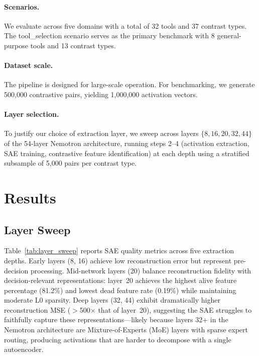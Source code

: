 \documentclass[runningheads]{llncs}
\begin{document}
\paragraph{Scenarios.} We evaluate across five domains with a total of 32 tools and 37 contrast types. The tool\_selection scenario serves as the primary benchmark with 8 general-purpose tools and 13 contrast types.

\paragraph{Dataset scale.} The pipeline is designed for large-scale operation. For benchmarking, we generate 500,000 contrastive pairs, yielding 1,000,000 activation vectors.

\paragraph{Layer selection.} To justify our choice of extraction layer, we sweep across layers $\{8, 16, 20, 32, 44\}$ of the 54-layer Nemotron architecture, running steps 2--4 (activation extraction, SAE training, contrastive feature identification) at each depth using a stratified subsample of 5,000 pairs per contrast type.

\section{Results}
\label{sec:results}

\subsection{Layer Sweep}

Table~\ref{tab:layer_sweep} reports SAE quality metrics across five extraction depths. Early layers (8, 16) achieve low reconstruction error but represent pre-decision processing. Mid-network layers (20) balance reconstruction fidelity with decision-relevant representations: layer~20 achieves the highest alive feature percentage (81.2\%) and lowest dead feature rate (0.19\%) while maintaining moderate L0 sparsity. Deep layers (32, 44) exhibit dramatically higher reconstruction MSE ($>$500$\times$ that of layer~20), suggesting the SAE struggles to faithfully capture these representations---likely because layers 32+ in the Nemotron architecture are Mixture-of-Experts (MoE) layers with sparse expert routing, producing activations that are harder to decompose with a single autoencoder.
\end{document}
